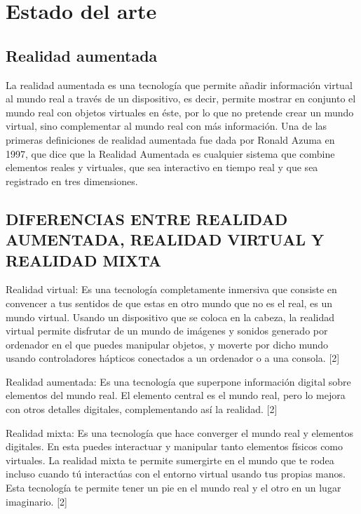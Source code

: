 \chapter{Estado del arte}
\label{ch:estado}

\section{Realidad aumentada}
La realidad aumentada es una tecnología que permite añadir información virtual al mundo real a través de un dispositivo, es decir, permite mostrar en conjunto el mundo real con objetos virtuales en éste, por lo que no pretende crear un mundo virtual, sino complementar al mundo real con más información. Una de las primeras definiciones de realidad aumentada fue dada por Ronald Azuma en 1997, que dice que la Realidad Aumentada es cualquier sistema que combine elementos reales y virtuales, que sea interactivo en tiempo real y que sea registrado en tres dimensiones. \cite{azuma}

\section{DIFERENCIAS ENTRE REALIDAD AUMENTADA, REALIDAD VIRTUAL Y REALIDAD MIXTA}
Realidad virtual: Es una tecnología completamente inmersiva que consiste en convencer a tus sentidos de que estas en otro mundo que no es el real, es un mundo virtual. Usando un dispositivo que se coloca en la cabeza, la realidad virtual permite disfrutar de un mundo de imágenes y sonidos generado por ordenador en el que puedes manipular objetos, y moverte por dicho mundo usando controladores hápticos conectados a un ordenador o a una consola. [2]

Realidad aumentada: Es una tecnología que superpone información digital sobre elementos del mundo real. El elemento central es el mundo real, pero lo mejora con otros detalles digitales, complementando así la realidad. [2]

Realidad mixta: Es una tecnología que hace converger el mundo real y elementos digitales. En esta puedes interactuar y manipular tanto elementos físicos como virtuales. La realidad mixta te permite sumergirte en el mundo que te rodea incluso cuando tú interactúas con el entorno virtual usando tus propias manos. Esta tecnología te permite tener un pie en el mundo real y el otro en un lugar imaginario. [2]

